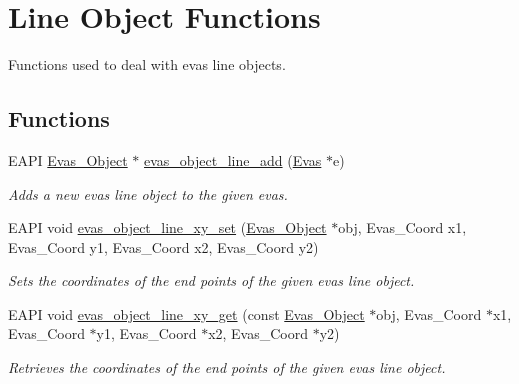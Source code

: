 \section{Line Object Functions}
\label{group__Evas__Line__Group}


Functions used to deal with evas line objects.  


\subsection*{Functions}
\begin{DoxyCompactItemize}
\item 
EAPI \hyperlink{group__Evas__Object__Group_ga9e19e6dd1f517a0ba437c0114d3e7c97}{Evas\_\-Object} $\ast$ \hyperlink{group__Evas__Line__Group_ga896f1beaea24379495af4cbc5efcebfe}{evas\_\-object\_\-line\_\-add} (\hyperlink{group__Evas__Canvas_ga5ff87cc4ce6bc43e3b640a6d37f73043}{Evas} $\ast$e)
\begin{DoxyCompactList}\small\item\em Adds a new evas line object to the given evas. \item\end{DoxyCompactList}\item 
EAPI void \hyperlink{group__Evas__Line__Group_gaa43185929e6e41e9c7315d2230665174}{evas\_\-object\_\-line\_\-xy\_\-set} (\hyperlink{group__Evas__Object__Group_ga9e19e6dd1f517a0ba437c0114d3e7c97}{Evas\_\-Object} $\ast$obj, Evas\_\-Coord x1, Evas\_\-Coord y1, Evas\_\-Coord x2, Evas\_\-Coord y2)
\begin{DoxyCompactList}\small\item\em Sets the coordinates of the end points of the given evas line object. \item\end{DoxyCompactList}\item 
EAPI void \hyperlink{group__Evas__Line__Group_ga3fa674863aa41d655caa103f546a9092}{evas\_\-object\_\-line\_\-xy\_\-get} (const \hyperlink{group__Evas__Object__Group_ga9e19e6dd1f517a0ba437c0114d3e7c97}{Evas\_\-Object} $\ast$obj, Evas\_\-Coord $\ast$x1, Evas\_\-Coord $\ast$y1, Evas\_\-Coord $\ast$x2, Evas\_\-Coord $\ast$y2)
\begin{DoxyCompactList}\small\item\em Retrieves the coordinates of the end points of the given evas line object. \item\end{DoxyCompactList}\end{DoxyCompactItemize}


